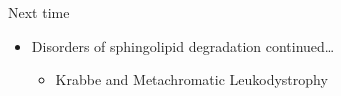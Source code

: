 \documentclass[presentation, smaller]{beamer}
\begin{document}
\begin{frame}[label={sec:orgheadline24}]{Next time}
\begin{itemize}
\item Disorders of sphingolipid degradation continued\ldots{}
\begin{itemize}
\item Krabbe and Metachromatic Leukodystrophy
\end{itemize}
\end{itemize}
\end{frame}
\end{document}
